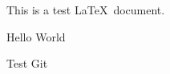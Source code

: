 \documentclass{article}
\begin{document}
This is a test \LaTeX\ document.

Hello World

Test Git
\end{document}
